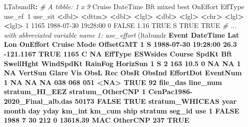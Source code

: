 \documentclass[
]{book}
\newenvironment{Shaded}{\begin{snugshade}}{\end{snugshade}}
\newcommand{\CommentTok}[1]{\textcolor[rgb]{0.56,0.35,0.01}{\textit{#1}}}
\newcommand{\DecValTok}[1]{\textcolor[rgb]{0.00,0.00,0.81}{#1}}
\newcommand{\ErrorTok}[1]{\textcolor[rgb]{0.64,0.00,0.00}{\textbf{#1}}}
\newcommand{\FloatTok}[1]{\textcolor[rgb]{0.00,0.00,0.81}{#1}}
\newcommand{\KeywordTok}[1]{\textcolor[rgb]{0.13,0.29,0.53}{\textbf{#1}}}
\newcommand{\NormalTok}[1]{#1}
\newcommand{\OperatorTok}[1]{\textcolor[rgb]{0.81,0.36,0.00}{\textbf{#1}}}
\newcommand{\OtherTok}[1]{\textcolor[rgb]{0.56,0.35,0.01}{#1}}
\newcommand{\StringTok}[1]{\textcolor[rgb]{0.31,0.60,0.02}{#1}}
\begin{document}
\begin{Shaded}
\begin{Highlighting}[]
\NormalTok{LTabundR}\OperatorTok{:}
\CommentTok{# A tibble: 1 x 9}
\StringTok{  }\NormalTok{Cruise DateTime              Bft mixed  best OnEffort EffType use_ef}\OperatorTok{~}\DecValTok{1}\NormalTok{ use_sit}
   \OperatorTok{<}\NormalTok{dbl}\OperatorTok{>}\StringTok{ }\ErrorTok{<}\NormalTok{dttm}\OperatorTok{>}\StringTok{              }\ErrorTok{<}\NormalTok{dbl}\OperatorTok{>}\StringTok{ }\ErrorTok{<}\NormalTok{lgl}\OperatorTok{>}\StringTok{ }\ErrorTok{<}\NormalTok{dbl}\OperatorTok{>}\StringTok{ }\ErrorTok{<}\NormalTok{lgl}\OperatorTok{>}\StringTok{    }\ErrorTok{<}\NormalTok{chr}\OperatorTok{>}\StringTok{   }\ErrorTok{<}\NormalTok{lgl}\OperatorTok{>}\StringTok{    }\ErrorTok{<}\NormalTok{lgl}\OperatorTok{>}\StringTok{  }
\DecValTok{1}   \DecValTok{1165} \DecValTok{1988-07-30} \DecValTok{19}\OperatorTok{:}\DecValTok{28}\OperatorTok{:}\DecValTok{00}     \DecValTok{0} \OtherTok{FALSE}  \FloatTok{1.16} \OtherTok{TRUE}\NormalTok{     S       }\OtherTok{TRUE}     \OtherTok{TRUE}   
\CommentTok{# ... with abbreviated variable name 1: use_effort}
\NormalTok{(ltabundr }\OperatorTok{%
\NormalTok{  Event            DateTime  Lat       Lon OnEffort Cruise Mode OffsetGMT}
\DecValTok{1}\NormalTok{     S }\DecValTok{1988-07-30} \DecValTok{19}\OperatorTok{:}\DecValTok{28}\OperatorTok{:}\DecValTok{00} \FloatTok{26.3} \FloatTok{-121.1167}     \OtherTok{TRUE}   \DecValTok{1165}\NormalTok{    C        }\OtherTok{NA}
\NormalTok{  EffType ESWsides Course SpdKt Bft SwellHght WindSpdKt RainFog HorizSun}
\DecValTok{1}\NormalTok{       S        }\DecValTok{2}    \DecValTok{163}  \FloatTok{10.5}   \DecValTok{0}        \OtherTok{NA}        \OtherTok{NA}       \DecValTok{1}       \OtherTok{NA}
\NormalTok{  VertSun Glare Vis ObsL Rec ObsR ObsInd EffortDot EventNum}
\DecValTok{1}      \OtherTok{NA}    \OtherTok{NA}  \OtherTok{NA}  \DecValTok{038} \DecValTok{068}  \DecValTok{051}   \OperatorTok{<}\OtherTok{NA}\OperatorTok{>}\StringTok{      }\OtherTok{TRUE}       \DecValTok{92}
\NormalTok{                       file_das line_num stratum_HI_EEZ stratum_OtherCNP}
\DecValTok{1}\NormalTok{ CenPac1986}\DecValTok{-2020}\NormalTok{_Final_alb.das    }\DecValTok{50173}          \OtherTok{FALSE}             \OtherTok{TRUE}
\NormalTok{  stratum_WHICEAS year month day yday km_int   km_cum ship  stratum seg_id  use}
\DecValTok{1}           \OtherTok{FALSE} \DecValTok{1988}     \DecValTok{7}  \DecValTok{30}  \DecValTok{212}      \DecValTok{0} \FloatTok{13618.39}\NormalTok{  MAC OtherCNP    }\DecValTok{237} \OtherTok{TRUE}
}
\end{Highlighting}
\end{Shaded}
\end{document}
